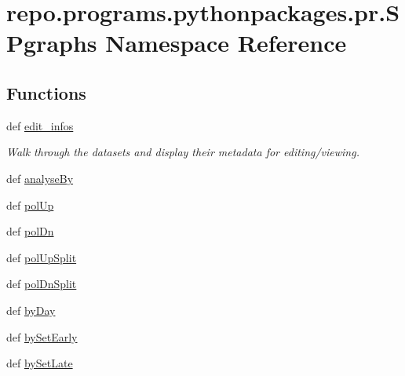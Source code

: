 \hypertarget{namespacerepo_1_1programs_1_1pythonpackages_1_1pr_1_1SPgraphs}{\section{repo.\-programs.\-pythonpackages.\-pr.\-S\-Pgraphs Namespace Reference}
\label{namespacerepo_1_1programs_1_1pythonpackages_1_1pr_1_1SPgraphs}
}
\subsection*{Functions}
\begin{DoxyCompactItemize}
\item 
def \hyperlink{namespacerepo_1_1programs_1_1pythonpackages_1_1pr_1_1SPgraphs_a0b2bbf659ee5ec02aa5cb7daad91c280}{edit\-\_\-infos}
\begin{DoxyCompactList}\small\item\em Walk through the datasets and display their metadata for editing/viewing. \end{DoxyCompactList}\item 
def \hyperlink{namespacerepo_1_1programs_1_1pythonpackages_1_1pr_1_1SPgraphs_ac526cfdccd3db288e299b42806782f66}{analyse\-By}
\item 
def \hyperlink{namespacerepo_1_1programs_1_1pythonpackages_1_1pr_1_1SPgraphs_a7b29c4cfd4985b53c2ee0a982eec3760}{pol\-Up}
\item 
def \hyperlink{namespacerepo_1_1programs_1_1pythonpackages_1_1pr_1_1SPgraphs_a3ec55dabf6134d7fff5d974ff35af920}{pol\-Dn}
\item 
def \hyperlink{namespacerepo_1_1programs_1_1pythonpackages_1_1pr_1_1SPgraphs_a697fa8b8c89c0679ddea4fe27fa68714}{pol\-Up\-Split}
\item 
def \hyperlink{namespacerepo_1_1programs_1_1pythonpackages_1_1pr_1_1SPgraphs_ac63344d1aeb7aa62c61dd21af0bb093d}{pol\-Dn\-Split}
\item 
def \hyperlink{namespacerepo_1_1programs_1_1pythonpackages_1_1pr_1_1SPgraphs_ae66d67a1bdf6628e901a61a60a2ed75e}{by\-Day}
\item 
def \hyperlink{namespacerepo_1_1programs_1_1pythonpackages_1_1pr_1_1SPgraphs_a69817958c436311d169582bdc6f2c5cf}{by\-Set\-Early}
\item 
def \hyperlink{namespacerepo_1_1programs_1_1pythonpackages_1_1pr_1_1SPgraphs_ac4f9ba0c7d5b5bfadded9af98ee6890c}{by\-Set\-Late}
\item 

\end{DoxyCompactItemize}
